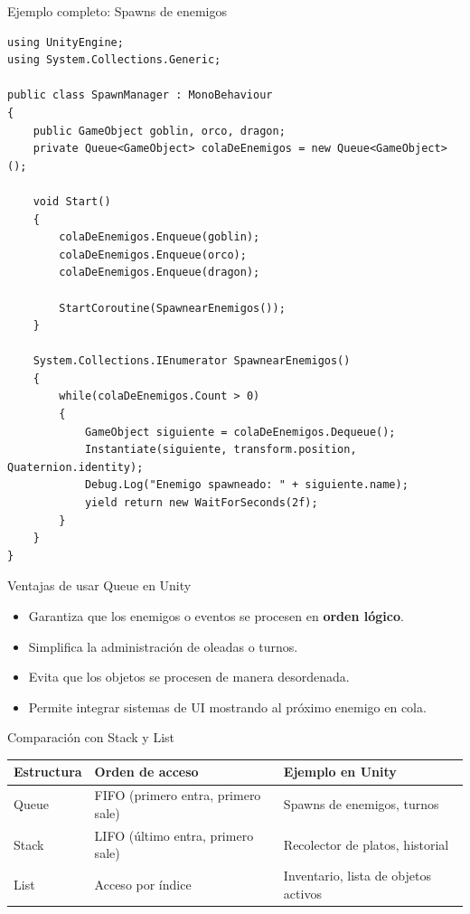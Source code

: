 \documentclass{beamer}
\begin{document}
\begin{frame}[fragile]{Ejemplo completo: Spawns de enemigos}
\lstset{style=CSharpStyle}
\begin{lstlisting}
using UnityEngine;
using System.Collections.Generic;

public class SpawnManager : MonoBehaviour
{
    public GameObject goblin, orco, dragon;
    private Queue<GameObject> colaDeEnemigos = new Queue<GameObject>();

    void Start()
    {
        colaDeEnemigos.Enqueue(goblin);
        colaDeEnemigos.Enqueue(orco);
        colaDeEnemigos.Enqueue(dragon);

        StartCoroutine(SpawnearEnemigos());
    }

    System.Collections.IEnumerator SpawnearEnemigos()
    {
        while(colaDeEnemigos.Count > 0)
        {
            GameObject siguiente = colaDeEnemigos.Dequeue();
            Instantiate(siguiente, transform.position, Quaternion.identity);
            Debug.Log("Enemigo spawneado: " + siguiente.name);
            yield return new WaitForSeconds(2f);
        }
    }
}
\end{lstlisting}
\end{frame}

\begin{frame}{Ventajas de usar Queue en Unity}
\begin{itemize}
    \item Garantiza que los enemigos o eventos se procesen en \textbf{orden lógico}.
    \item Simplifica la administración de oleadas o turnos.
    \item Evita que los objetos se procesen de manera desordenada.
    \item Permite integrar sistemas de UI mostrando al próximo enemigo en cola.
\end{itemize}
\end{frame}

\begin{frame}{Comparación con Stack y List}
\begin{table}[]
\centering
\begin{tabular}{|l|l|l|}
\hline
\textbf{Estructura} & \textbf{Orden de acceso} & \textbf{Ejemplo en Unity} \\ \hline
Queue & FIFO (primero entra, primero sale) & Spawns de enemigos, turnos \\ \hline
Stack & LIFO (último entra, primero sale) & Recolector de platos, historial \\ \hline
List & Acceso por índice & Inventario, lista de objetos activos \\ \hline
\end{tabular}
\end{table}
\end{frame}
\end{document}
